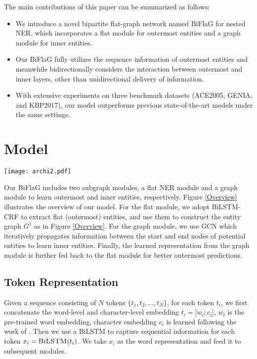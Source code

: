 \documentclass[11pt,a4paper]{article}
\begin{document}
The main contributions of this paper can be summarized as follows:
\begin{itemize}
    \item We introduce a novel bipartite flat-graph network named BiFlaG for nested NER, which incorporates a flat module for outermost entities and a graph module for inner entities.
    \item Our BiFlaG fully utilizes the sequence information of outermost entities and meanwhile bidirectionally considers the interaction between outermost and inner layers, other than unidirectional delivery of information.
    \item With extensive experiments on three benchmark datasets (ACE2005, GENIA, and KBP2017), our model outperforms previous state-of-the-art models under the same settings.
\end{itemize} 

\section{Model}

\begin{figure*}[!t]
  \centering 
  \texttt{[image: archi2.pdf]} 
    \caption{The framework of our BiFlaG model. $G^1$ and $G^2$ are entity graph and adjacent graph created for GCN, each dashed line connects the start and end nodes for a potential entity. Solid red lines indicate inner entities recognized by the graph module.}\label{Overview}
\end{figure*} 


Our BiFlaG includes two subgraph modules, a flat NER module and a graph module to learn outermost and inner entities, respectively. Figure \ref{Overview} illustrates the overview of our model.
For the flat module, we adopt BiLSTM-CRF to extract flat (outermost) entities, and use them to construct the entity graph $G^1$ as in Figure \ref{Overview}.
For the graph module, we use GCN which iteratively propagates information between the start and end nodes of potential entities to learn inner entities. Finally, the learned representation from the graph module is further fed back to the flat module for better outermost predictions.


\subsection{Token Representation}
Given a sequence consisting of $N$ tokens $\{t_1, t_2, ..., t_N\}$, for each token $t_i$, we first concatenate the word-level and character-level embedding  $t_i = [w_i; c_i$], $w_i$ is the pre-trained word embedding, character embedding $c_i$ is learned following the work of \cite{xin2018learning}. Then we use a BiLSTM to capture sequential information for each token $x_i = \Call{BiLSTM}{t_i}$.
We take $x_i$ as the word representation and feed it to subsequent modules. 
\end{document}

